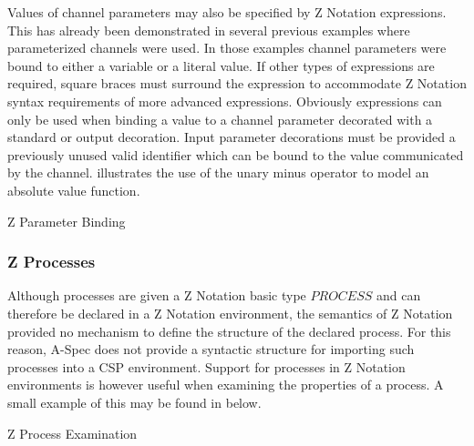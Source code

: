 \documentclass[letterpaper,10pt,draft]{book}
\begin{document}
Values of channel parameters may also be specified by Z Notation expressions.  This
has already been demonstrated in several previous examples where parameterized channels
were used.  In those examples channel parameters were bound to either a variable
or a literal value.  If other types of expressions are required, square braces must
surround the expression to accommodate Z Notation syntax requirements of more advanced
expressions.  Obviously expressions can only be used when binding a value to a channel
parameter decorated with a standard or output decoration.  Input parameter decorations
must be provided a previously unused valid identifier which can be bound to the
value communicated by the channel.   illustrates the use of the
unary minus operator to model an absolute value function.

\begin{example}
\begin{minipage}[t]{0.49\linewidth}
   
\end{minipage}
\begin{minipage}[t]{0.49\linewidth}
   \azbox
   
\end{minipage}

   \caption{Z Parameter Binding}
   \label{ex:ZParam}
\end{example}

\subsubsection{Z Processes}
   \label{sect:CSPZProc}

Although processes are given a Z Notation basic type $PROCESS$ and can therefore
be declared in a Z Notation environment, the semantics of Z Notation provided no
mechanism to define the structure of the declared process.  For this reason, A-Spec
does not provide a syntactic structure for importing such processes into a CSP environment.
Support for processes in Z Notation environments is however useful when examining
the properties of a process.  A small example of this may be found in 
below.

\begin{example}
\begin{minipage}[t]{0.49\linewidth}
   
\end{minipage}
\begin{minipage}[t]{0.49\linewidth}
   \azbox
   
\end{minipage}

   \caption{Z Process Examination}
   \label{ex:ZProc}
\end{example}
\end{document}
